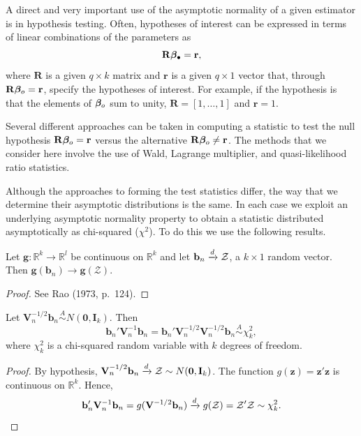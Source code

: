 A direct and very important use of the asymptotic normality of a given
estimator is in hypothesis testing. Often, hypotheses of interest can be
expressed in terms of linear combinations of the parameters as
\[
\mathbf{R}\boldsymbol{\beta}_\bullet = \mathbf{r},
\]
where $\mathbf{R}$ is a given $q \times k$ matrix and $\mathbf{r}$ is a given $q \times 1$ vector that, through
$\mathbf{R}\boldsymbol{\beta}_o = \mathbf{r}$, specify the hypotheses of interest. For example, if the hypothesis
is that the elements of $\boldsymbol{\beta}_o$ sum to unity, $\mathbf{R} = [1, \ldots, 1]$ and $\mathbf{r} = 1$.

Several different approaches can be taken in computing a statistic to test
the null hypothesis $\mathbf{R}\boldsymbol{\beta}_o = \mathbf{r}$ versus the alternative $\mathbf{R}\boldsymbol{\beta}_o \neq \mathbf{r}$. The methods
that we consider here involve the use of Wald, Lagrange multiplier, and
quasi-likelihood ratio statistics.

Although the approaches to forming the test statistics differ, the way
that we determine their asymptotic distributions is the same. In each case
we exploit an underlying asymptotic normality property to obtain a statistic distributed asymptotically as chi-squared ($\chi^2$). To do this we use the
following results.

\begin{lemma}\label{lem:4.27}
Let $\mathbf{g} : \mathbb{R}^k \to \mathbb{R}^l$ be continuous on $\mathbb{R}^k$ and let $\mathbf{b}_n \xrightarrow{d} \mathcal{Z}$, a $k \times 1$ random vector. Then $\mathbf{g}(\mathbf{b}_n) \to \mathbf{g}(\mathcal{Z})$.
\end{lemma}

\begin{proof}
See Rao (1973, p.~124).
\end{proof}

\begin{corollary}\label{cor:4.28}
Let $\mathbf{V}_n^{-1/2}\mathbf{b}_n \overset{A}{\sim} N(\mathbf{0}, \mathbf{I}_k)$. Then
\[
\mathbf{b}_n'\mathbf{V}_n^{-1}\mathbf{b}_n = \mathbf{b}_n'\mathbf{V}_n^{-1/2}\mathbf{V}_n^{-1/2}\mathbf{b}_n \overset{A}{\sim} \chi_k^2,
\]
where $\chi_k^2$ is a chi-squared random variable with $k$ degrees of freedom.
\end{corollary}

\begin{proof}
By hypothesis, $\mathbf{V}_n^{-1/2}\mathbf{b}_n \xrightarrow{d} \mathcal{Z} \sim N(\mathbf{0}, \mathbf{I}_k)$. The function $g(\mathbf{z}) = \mathbf{z}'\mathbf{z}$ is continuous on $\mathbb{R}^k$. Hence,
\[
\mathbf{b}_n'\mathbf{V}_n^{-1}\mathbf{b}_n = g(\mathbf{V}^{-1/2}\mathbf{b}_n) \xrightarrow{d} g(\mathcal{Z}) = \mathcal{Z}'\mathcal{Z} \sim \chi_k^2.
\]
\end{proof}

